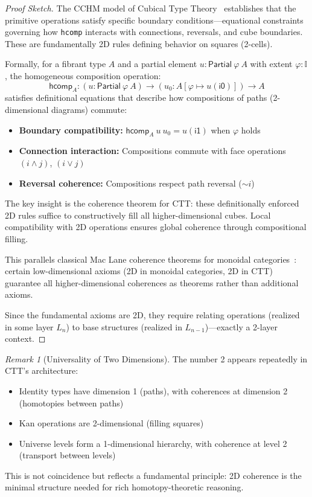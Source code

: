 \documentclass[11pt]{article}
\theoremstyle{definition}
\theoremstyle{remark}
\newtheorem{remark}[theorem]{Remark}
\begin{document}
\begin{proof}[Proof Sketch]
The CCHM model of Cubical Type Theory~\cite{cohen2018cubical} establishes that the primitive operations
satisfy specific boundary conditions---equational constraints governing how \texttt{hcomp} interacts with
connections, reversals, and cube boundaries. These are fundamentally 2D rules defining behavior on
squares (2-cells).

Formally, for a fibrant type $A$ and a partial element $u : \mathsf{Partial}\ \varphi\ A$ with extent $\varphi : \mathbb{I}$,
the homogeneous composition operation:
\[
\mathsf{hcomp}_A : (u : \mathsf{Partial}\ \varphi\ A) \to (u_0 : A[\varphi \mapsto u(\mathsf{i0})]) \to A
\]
satisfies definitional equations that describe how compositions of paths (2-dimensional diagrams)
commute:
\begin{itemize}
\item \textbf{Boundary compatibility:} $\mathsf{hcomp}_A\ u\ u_0 = u(\mathsf{i1})$ when $\varphi$ holds
\item \textbf{Connection interaction:} Compositions commute with face operations $(i \wedge j)$, $(i \vee j)$
\item \textbf{Reversal coherence:} Compositions respect path reversal ($\sim i$)
\end{itemize}

The key insight is the coherence theorem for CTT: these definitionally enforced 2D rules suffice
to constructively fill all higher-dimensional cubes. Local compatibility with 2D operations ensures
global coherence through compositional filling.

This parallels classical Mac Lane coherence theorems for monoidal categories~\cite{maclane1963natural}:
certain low-dimensional axioms (2D in monoidal categories, 2D in CTT) guarantee all higher-dimensional
coherences as theorems rather than additional axioms.

Since the fundamental axioms are 2D, they require relating operations (realized in some layer
$L_n$) to base structures (realized in $L_{n-1}$)---exactly a 2-layer context.
\end{proof}

\begin{remark}[Universality of Two Dimensions]
The number 2 appears repeatedly in CTT's architecture:
\begin{itemize}
\item Identity types have dimension 1 (paths), with coherences at dimension 2 (homotopies between
paths)
\item Kan operations are 2-dimensional (filling squares)
\item Universe levels form a 1-dimensional hierarchy, with coherence at level 2 (transport between
levels)
\end{itemize}
This is not coincidence but reflects a fundamental principle: 2D coherence is the minimal structure
needed for rich homotopy-theoretic reasoning.
\end{remark}
\end{document}
